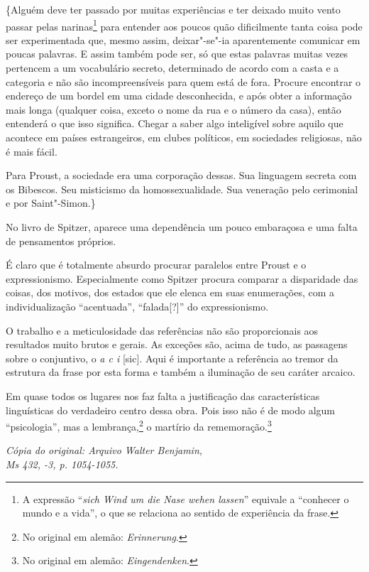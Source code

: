 \{Alguém deve ter passado por muitas experiências e ter deixado muito
vento passar pelas narinas\footnote{A expressão ``\emph{sich Wind um die
  Nase wehen lassen}'' equivale a ``conhecer o mundo e a vida'', o que se
  relaciona ao sentido de experiência da frase. \versal{[N. T.]}} para entender aos
poucos quão dificilmente tanta coisa pode ser experimentada que, mesmo
assim, deixar"-se"-ia aparentemente comunicar em poucas palavras. E assim
também pode ser, só que estas palavras muitas vezes pertencem a um
vocabulário secreto, determinado de acordo com a casta e a categoria e %
não são incompreensíveis para quem está de fora. Procure encontrar o
endereço de um bordel em uma cidade desconhecida, e após obter a
informação mais longa (qualquer coisa, exceto o nome da rua e o número da
casa), então entenderá o que isso significa. Chegar a saber algo
inteligível sobre aquilo que acontece em países estrangeiros, em clubes
políticos, em sociedades religiosas, não é mais fácil.

Para Proust, a sociedade era uma corporação dessas. Sua linguagem
secreta com os Bibescos. Seu misticismo da homossexualidade. Sua
veneração pelo cerimonial e por Saint"-Simon.\}

No livro de Spitzer, aparece uma dependência um pouco embaraçosa e uma
falta de pensamentos próprios.

É claro que é totalmente absurdo procurar paralelos entre Proust e o
expressionismo. Especialmente como Spitzer procura comparar a disparidade
das coisas, dos motivos, dos estados que ele elenca em suas enumerações,
com a individualização ``acentuada'', ``falada{[}?{]}'' do expressionismo.

O trabalho e a meticulosidade das referências não são proporcionais aos
resultados muito brutos e gerais. As exceções são, acima de tudo, as
passagens sobre o conjuntivo, o \emph{a c i} {[}sic{]}. Aqui é
importante a referência ao tremor da estrutura da frase por esta forma e
também a iluminação de seu caráter arcaico.

Em quase todos os lugares nos faz falta a justificação das
características linguísticas do verdadeiro centro dessa obra. Pois isso
não é de modo algum ``psicologia'', mas a lembrança,\footnote{No
  original em alemão: \emph{Erinnerung}. \versal{[N. T.]}} o martírio da rememoração.\footnote{No original em alemão: \emph{Eingendenken}. \versal{[N. T.]}}

\begin{flushright}
\emph{\footnotesize{Cópia do original: Arquivo Walter Benjamin,\\ Ms 432, -3, p. 1054-1055.}}
\end{flushright}

